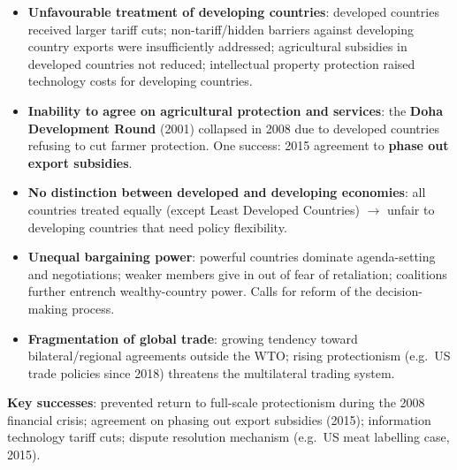 \begin{itemize}
  \item \textbf{Unfavourable treatment of developing countries}: developed countries received larger tariff cuts; non-tariff/hidden barriers against developing country exports were insufficiently addressed; agricultural subsidies in developed countries not reduced; intellectual property protection raised technology costs for developing countries.
  \item \textbf{Inability to agree on agricultural protection and services}: the \textbf{Doha Development Round} (2001) collapsed in 2008 due to developed countries refusing to cut farmer protection. One success: 2015 agreement to \textbf{phase out export subsidies}.
  \item \textbf{No distinction between developed and developing economies}: all countries treated equally (except Least Developed Countries) $\to$ unfair to developing countries that need policy flexibility.
  \item \textbf{Unequal bargaining power}: powerful countries dominate agenda-setting and negotiations; weaker members give in out of fear of retaliation; coalitions further entrench wealthy-country power. Calls for reform of the decision-making process.
  \item \textbf{Fragmentation of global trade}: growing tendency toward bilateral/regional agreements outside the WTO; rising protectionism (e.g.\ US trade policies since 2018) threatens the multilateral trading system.
\end{itemize}
\textbf{Key successes}: prevented return to full-scale protectionism during the 2008 financial crisis; agreement on phasing out export subsidies (2015); information technology tariff cuts; dispute resolution mechanism (e.g.\ US meat labelling case, 2015).

